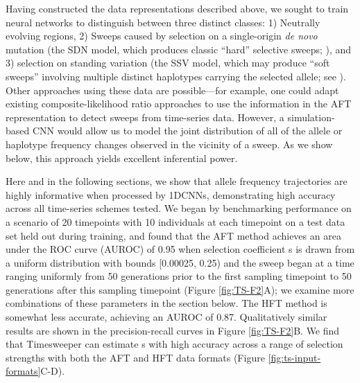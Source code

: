 Having constructed the data representations described above, we sought to train neural networks to distinguish between three distinct classes: 1) Neutrally evolving regions, 2) Sweeps caused by selection on a single-origin \textit{de novo} mutation (the SDN model, which produces classic “hard” selective sweeps; \cite{smithHitchhikingEffectFavourable1974}), and 3) selection on standing variation (the SSV model, which may produce “soft sweeps” involving multiple distinct haplotypes carrying the selected allele; see \cite{hermissonSoftSweepsMolecular2005,orrHaldaneSieveAdaptation2001}). Other approaches using these data are possible—for example, one could adapt existing composite-likelihood ratio approaches \cite{nielsenGenomicScansSelective2005,vyCompositeLikelihoodMethodDetecting2015} to use the information in the AFT representation to detect sweeps from time-series data. However, a simulation-based CNN would allow us to model the joint distribution of all of the allele or haplotype frequency changes observed in the vicinity of a sweep. As we show below, this approach yields excellent inferential power. 

Here and in the following sections, we show that allele frequency trajectories are highly informative when processed by 1DCNNs, demonstrating high accuracy across all time-series schemes tested. We began by benchmarking performance on a scenario of 20 timepoints with 10 individuals at each timepoint on a test data set held out during training, and found that the AFT method achieves an area under the ROC curve (AUROC) of 0.95 when selection coefficient s is drawn from a uniform distribution with bounds [0.00025, 0.25) and the sweep began at a time ranging uniformly from 50 generations prior to the first sampling timepoint to 50 generations after this sampling timepoint (Figure \ref{fig:TS-F2}A); we examine more combinations of these parameters in the section below. The HFT method is somewhat less accurate, achieving an AUROC of 0.87. Qualitatively similar results are shown in the precision-recall curves in Figure \ref{fig:TS-F2}B. We find that Timesweeper can estimate s with high accuracy across a range of selection strengths with both the AFT and HFT data formats (Figure \ref{fig:ts-input-formats}C-D). 

